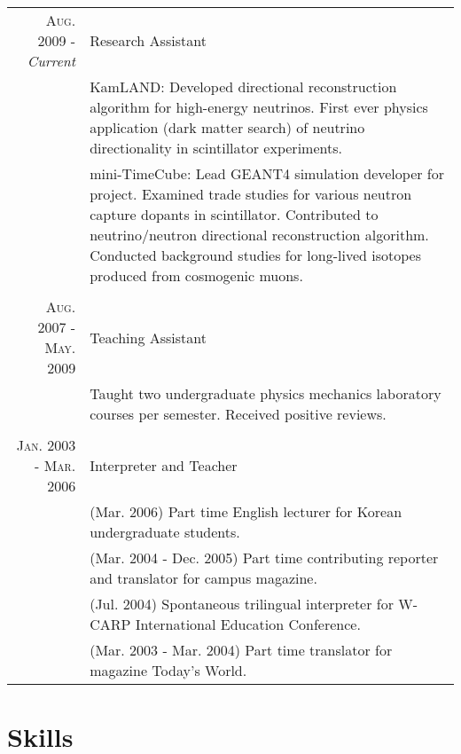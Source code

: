 \documentclass[a4paper,10pt]{article} %
\begin{document}
\begin{tabular}{r|p{10.4cm}}
\textsc{Aug. 2009 - }\textit{Current} & Research Assistant\\
& \footnotesize{
	KamLAND: Developed directional reconstruction algorithm for
	high-energy neutrinos.
	First ever physics application (dark matter search) of neutrino
	directionality in scintillator experiments.
}\\
& \footnotesize{
	mini-TimeCube: Lead GEANT4 simulation developer for project.
	Examined trade studies for various neutron capture dopants in
	scintillator.
	Contributed to neutrino/neutron directional reconstruction algorithm.
	Conducted background studies for long-lived isotopes produced from
	cosmogenic muons.
}\\
\multicolumn{2}{c}{} \\


\textsc{Aug. 2007 - May. 2009} & Teaching Assistant\\
& \footnotesize{
	Taught two undergraduate physics mechanics laboratory courses per semester.
	Received positive reviews.
}\\
\multicolumn{2}{c}{} \\


\textsc{Jan. 2003 - Mar. 2006} & Interpreter and Teacher\\
& \footnotesize{(Mar. 2006) Part time English lecturer for Korean undergraduate
students.}\\
& \footnotesize{(Mar. 2004 - Dec. 2005) Part time contributing reporter and
translator for campus magazine.}\\
& \footnotesize{(Jul. 2004) Spontaneous trilingual interpreter for W-CARP
International Education Conference.}\\
& \footnotesize{(Mar. 2003 - Mar. 2004) Part time translator for magazine Today's World.}\\
\end{tabular}


\section{Skills}
\end{document}
